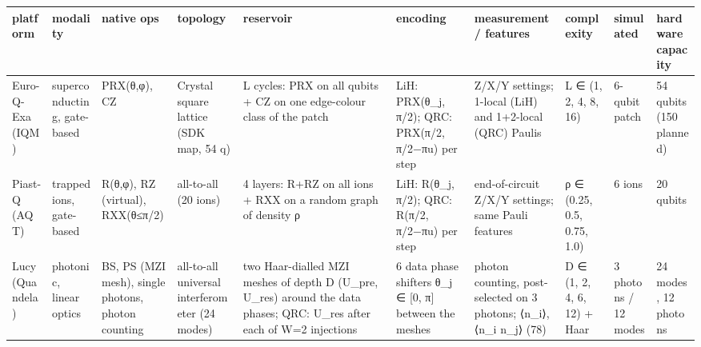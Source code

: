 \begin{tabular}{llllllllll}
\toprule
platform & modality & native ops & topology & reservoir & encoding & measurement / features & complexity & simulated & hardware capacity \\
\midrule
Euro-Q-Exa (IQM) & superconducting, gate-based & PRX(θ,φ), CZ & Crystal square lattice (SDK map, 54 q) & L cycles: PRX on all qubits + CZ on one edge-colour class of the patch & LiH: PRX(θ\_j, π/2); QRC: PRX(π/2, π/2−πu) per step & Z/X/Y settings; 1-local (LiH) and 1+2-local (QRC) Paulis & L ∈ (1, 2, 4, 8, 16) & 6-qubit patch & 54 qubits (150 planned) \\
Piast-Q (AQT) & trapped ions, gate-based & R(θ,φ), RZ (virtual), RXX(θ≤π/2) & all-to-all (20 ions) & 4 layers: R+RZ on all ions + RXX on a random graph of density ρ & LiH: R(θ\_j, π/2); QRC: R(π/2, π/2−πu) per step & end-of-circuit Z/X/Y settings; same Pauli features & ρ ∈ (0.25, 0.5, 0.75, 1.0) & 6 ions & 20 qubits \\
Lucy (Quandela) & photonic, linear optics & BS, PS (MZI mesh), single photons, photon counting & all-to-all universal interferometer (24 modes) & two Haar-dialled MZI meshes of depth D (U\_pre, U\_res) around the data phases; QRC: U\_res after each of W=2 injections & 6 data phase shifters θ\_j ∈ [0, π] between the meshes & photon counting, post-selected on 3 photons; ⟨n\_i⟩, ⟨n\_i n\_j⟩ (78) & D ∈ (1, 2, 4, 6, 12) + Haar & 3 photons / 12 modes & 24 modes, 12 photons \\
\bottomrule
\end{tabular}
